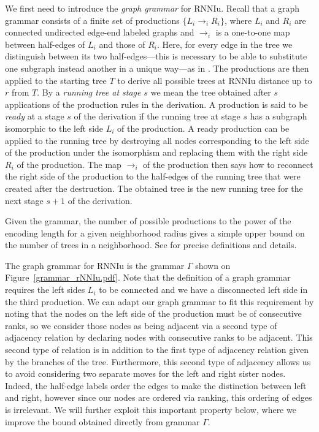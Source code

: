 \documentclass[11pt]{amsart}
\theoremstyle{definition}
\newcommand{\rnniu}{\mathrm{RNNIu}}
\begin{document}
We first need to introduce the \emph{graph grammar} for $\rnniu$.
Recall that a graph grammar consists of a finite set of productions $\{L_i \to_i R_i\}$, where $L_i$ and $R_i$ are connected undirected edge-end labeled graphs and $\to_i$ is a one-to-one map between half-edges of $L_i$ and those of $R_i$.
Here, for every edge in the tree we distinguish between its two half-edges---this is necessary to be able to substitute one subgraph instead another in a unique way---as in \autocite{Sleator1992-bp}.
The productions are then applied to the starting tree $T$ to derive all possible trees at $\rnniu$ distance up to $r$ from $T$.
By a \emph{running tree at stage $s$} we mean the tree obtained after $s$ applications of the production rules in the derivation.
A production is said to be \emph{ready} at a stage $s$ of the derivation if the running tree at stage $s$ has a subgraph isomorphic to the left side $L_i$ of the production.
A ready production can be applied to the running tree by destroying all nodes corresponding to the left side of the production under the isomorphism and replacing them with the right side $R_i$ of the production.
The map $\to_i$ of the production then says how to reconnect the right side of the production to the half-edges of the running tree that were created after the destruction.
The obtained tree is the new running tree for the next stage $s+1$ of the derivation.

Given the grammar, the number of possible productions to the power of the encoding length for a given neighborhood radius gives a simple upper bound on the number of trees in a neighborhood.
See \autocite{Sleator1992-bp} for precise definitions and details.

The graph grammar for $\rnniu$ is the grammar $\Gamma$ shown on Figure~\ref{grammar_rNNIu.pdf}.
Note that the definition of a graph grammar requires the left sides $L_i$ to be connected and we have a disconnected left side in the third production.
We can adapt our graph grammar to fit this requirement by noting that the nodes on the left side of the production must be of consecutive ranks, so we consider those nodes as being adjacent via a second type of adjacency relation by declaring nodes with consecutive ranks to be adjacent.
This second type of relation is in addition to the first type of adjacency relation given by the branches of the tree.
Furthermore, this second type of adjacency allows us to avoid considering two separate moves for the left and right sister nodes.
Indeed, the half-edge labels order the edges to make the distinction between left and right, however since our nodes are ordered via ranking, this ordering of edges is irrelevant.
We will further exploit this important property below, where we improve the bound obtained directly from grammar $\Gamma$.
\end{document}
